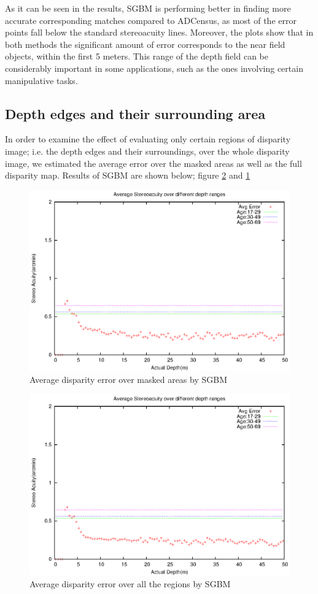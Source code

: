 As it can be seen in the results, SGBM is performing better in finding more accurate corresponding matches 
compared to ADCensus, as most of the error points fall below the standard stereoacuity lines. Moreover, the plots show that in both methods 
the significant amount of error
corresponds to the near field objects, within the first 5 meters. This range of the depth field can be considerably important in some applications,
such as the ones involving certain manipulative tasks.

\subsection{Depth edges and their surrounding area}
In order to examine the effect of evaluating only certain regions of disparity image; i.e. the depth edges and their surroundings, 
over the whole disparity image, we estimated the average error over the masked areas as well as the full disparity map. 
Results of SGBM are shown below; figure \ref{fig:sgbmfull3} and \ref{fig:sgbmmsk3}

\begin{figure}[H]
\centering
\includegraphics[scale=0.8]{sgbmmsk3}
\caption{Average disparity error over masked areas by SGBM}
\label{fig:sgbmmsk3}
\end{figure} 

\begin{figure}[H]
\centering
\includegraphics[scale=0.8]{sgbmfull3}
\caption{Average disparity error over all the regions by SGBM}
\label{fig:sgbmfull3}
\end{figure} 



